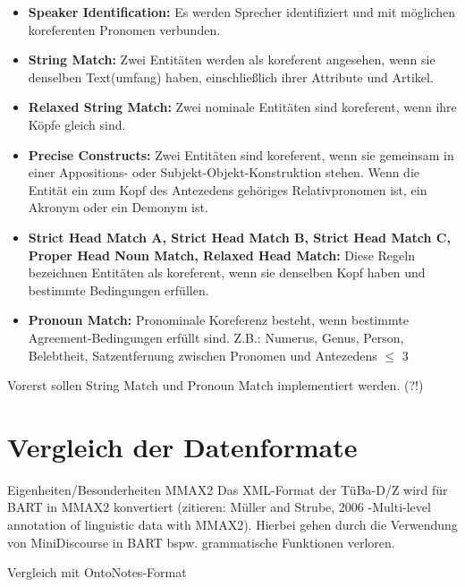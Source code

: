 \documentclass{scrartcl}
\begin{document}
\begin{itemize}
\item \textbf{Speaker Identification:} Es werden Sprecher identifiziert und mit m\"oglichen koreferenten Pronomen verbunden. 
\item \textbf{String Match:} Zwei Entit\"aten werden als koreferent angesehen, wenn sie denselben Text(umfang) haben, einschlie{\ss}lich ihrer Attribute und Artikel. 
\item \textbf{Relaxed String Match:} Zwei nominale Entit\"aten sind koreferent, wenn ihre K\"opfe gleich sind.
\item \textbf{Precise Constructs:} Zwei Entit\"aten sind koreferent, wenn sie gemeinsam in einer Appositions- oder Subjekt-Objekt-Konstruktion stehen. Wenn die Entit\"at ein zum Kopf des Antezedens geh\"origes Relativpronomen ist, ein Akronym oder ein Demonym ist. 
\item \textbf{Strict Head Match A, Strict Head Match B, Strict Head Match C, Proper Head Noun Match, Relaxed Head Match:} Diese Regeln bezeichnen Entit\"aten als koreferent, wenn sie denselben Kopf haben und bestimmte Bedingungen erf\"ullen. 
\item \textbf{Pronoun Match:} Pronominale Koreferenz besteht, wenn bestimmte Agreement-Bedingungen erf\"ullt sind. Z.B.: Numerus, Genus, Person, Belebtheit, Satzentfernung zwischen Pronomen und Antezedens ${\leq}$ 3
\end{itemize}

Vorerst sollen String Match und Pronoun Match implementiert werden. (?!)


\section{Vergleich der Datenformate}
Eigenheiten/Besonderheiten MMAX2
Das XML-Format der TüBa-D/Z wird für BART in MMAX2 konvertiert (zitieren: Müller and Strube, 2006 -Multi-level annotation of linguistic data with MMAX2).
Hierbei gehen durch die Verwendung von MiniDiscourse in BART bspw. grammatische Funktionen verloren.

Vergleich mit OntoNotes-Format


\nocite{*}


\end{document}
